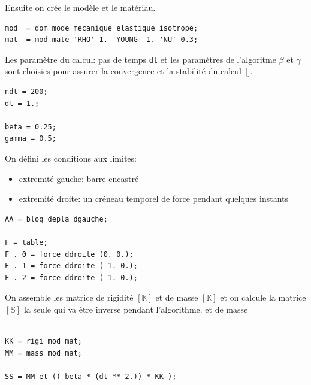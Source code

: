  
\begin{castemcom}
Ensuite on crée le modèle et le matériau. 
\end{castemcom}
\begin{castemlines}
\begin{verbatim}
mod  = dom mode mecanique elastique isotrope;
mat  = mod mate 'RHO' 1. 'YOUNG' 1. 'NU' 0.3; 
\end{verbatim}
\end{castemlines}

 
\begin{castemcom}
Les paramètre du calcul: pas de temps \texttt{dt} 
et les paramètres de l'algoritme $\beta$ et $\gamma$
sont choisies pour assurer la convergence et la 
stabilité du calcul~\ref{}.
\end{castemcom}
\begin{castemlines}
\begin{verbatim}
ndt = 200;
dt = 1.;

beta = 0.25;
gamma = 0.5;
\end{verbatim}
\end{castemlines}

 
\begin{castemcom}
On défini les conditions aux limites:
\begin{itemize}
  \item extremité gauche: barre encastré 
  \item extremité droite: un créneau temporel de force
     pendant quelques instants   
\end{itemize}
\end{castemcom}
\begin{castemlines}
\begin{verbatim}
AA = bloq depla dgauche;

F = table;
F . 0 = force ddroite (0. 0.); 
F . 1 = force ddroite (-1. 0.);
F . 2 = force ddroite (-1. 0.);
\end{verbatim}
\end{castemlines}

\begin{castemcom}
On assemble les matrice de rigidité $[\mathbb{K}]$
et de masse $[\mathbb{K}]$ et on calcule la 
matrice $[\mathbb{S}]$ la seule qui va être inverse
pendant l'algorithme.  
et de masse  
\end{castemcom}
\begin{castemlines}
\begin{verbatim}

KK = rigi mod mat; 
MM = mass mod mat;

SS = MM et (( beta * (dt ** 2.)) * KK );

\end{verbatim}
\end{castemlines}

